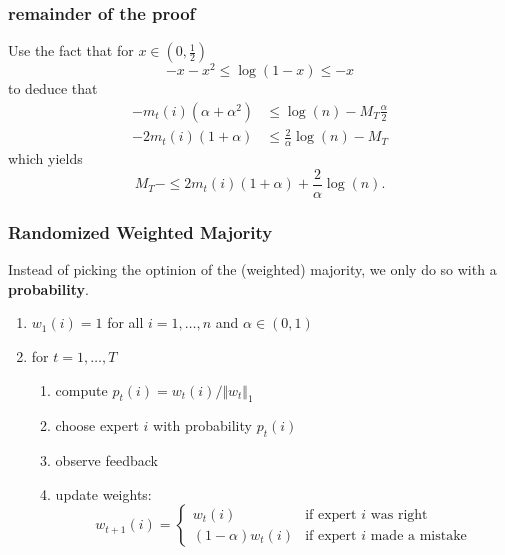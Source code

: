 \documentclass{beamer}
\begin{document}
%
\begin{frame}
  \frametitle{remainder of the proof}
  Use the fact that for $x\in (0,\frac12)$
  \begin{equation}
    -x -x^2 \le \log(1-x) \le -x
  \end{equation}
  to deduce that
  \begin{equation}
    \begin{aligned}
    - m_t(i) (\alpha+\alpha^2) &\le \log(n) - M_T \frac{\alpha}{2} \\
    -2 m_t(i) (1+\alpha) &\le \frac{2}{\alpha}\log(n) - M_T
    \end{aligned}
  \end{equation}
  which yields
  \begin{equation}
    M_T -  \le 2 m_t(i) (1+\alpha) + \frac{2}{\alpha}\log(n).
  \end{equation}
\end{frame}


\begin{frame}
  \frametitle{Randomized Weighted Majority}

  Instead of picking the optinion of the (weighted) majority, we only do so with a \textbf{probability}.

  \begin{enumerate}
    \item $w_1(i) = 1$ for all $i = 1, \dots, n$ and $\alpha \in (0, 1)$
    \item for $t=1, \dots, T$
      \begin{enumerate}
      \item compute $p_t(i) = w_t(i)/\Vert w_t \Vert_1$
      \item choose expert $i$ with probability $p_t(i)$
      \item observe feedback
      \item update weights:
        \begin{equation}
          w_{t+1}(i) = \begin{cases}
              w_t(i) & \text{if expert $i$ was right} \\
              (1-\alpha)w_t(i) & \text{if expert $i$ made a mistake}
          \end{cases}
        \end{equation}

      \end{enumerate}
  \end{enumerate}

\end{frame}
\end{document}
